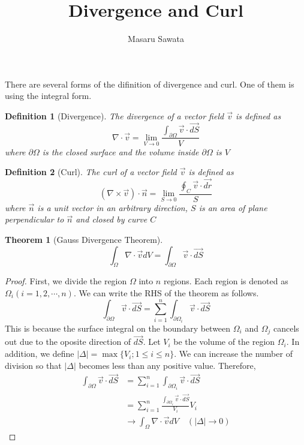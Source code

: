 \documentclass[letterpaper, 12pt]{article}
\title{Divergence and Curl}
\author{Masaru Sawata}
\theoremstyle{custom}
\newtheorem{definition}{Definition}
\newtheorem*{theorem}{Theorem}
\begin{document}
\maketitle
There are several forms of the difinition of divergence and curl. One of them is using the integral form.
\begin{definition}[Divergence]
  The divergence of a vector field $\vec{v}$ is defined as
  \begin{equation*}
    \nabla \cdot \vec{v} = \lim_{V \rightarrow 0} \frac{\displaystyle \int_{\partial \Omega} \vec{v} \cdot \vec{dS}}{V}
  \end{equation*}
  where $\partial \Omega$ is the closed surface and the volume inside $\partial \Omega$ is $V$
\end{definition}

\bigskip

\begin{definition}[Curl]
  The curl of a vector field $\vec{v}$ is defined as
  \begin{equation*}
    \left( \nabla \times \vec{v} \right) \cdot \vec{n} = \lim_{S \rightarrow 0} \frac{\displaystyle \oint_{C} \vec{v} \cdot \vec{dr}}{S}
  \end{equation*}
  where $\vec{n}$ is a unit vector in an arbitrary direction, $S$ is an area of plane perpendicular to $\vec{n}$ and closed by curve $C$
\end{definition}

\bigskip

\begin{theorem}[Gauss Divergence Theorem]
  \begin{equation*}
    \int_{\Omega} \nabla \cdot \vec{v} dV = \int_{\partial \Omega} \vec{v} \cdot \vec{dS}
  \end{equation*}
\end{theorem}
\begin{proof}
  First, we divide the region $\Omega$ into $n$ regions. Each region is denoted as $\Omega_i (i=1,2,\cdots , n)$.
  We can write the RHS of the theorem as follows.
  \begin{equation*}
    \int_{\partial \Omega} \vec{v} \cdot \vec{dS} = \sum_{i=1}^{n}\int_{\partial \Omega_i} \vec{v} \cdot \vec{dS}
  \end{equation*}
  This is because the surface integral on the boundary between $\Omega_i$ and $\Omega_j$ cancels out due to the oposite direction of $\vec{dS}$.
  Let $V_i$ be the volume of the region $\Omega_i$. In addition, we define $| \Delta |=\max \{ V_i;1 \leq i \leq n \}$.
  We can increase the number of division so that $| \Delta |$ becomes less than any positive value. Therefore,
  \begin{align*}
    \int_{\partial \Omega} \vec{v} \cdot \vec{dS} 
    &= \sum_{i=1}^{n}\int_{\partial \Omega_i} \vec{v} \cdot \vec{dS}\\
    &= \sum_{i=1}^{n}\frac{\displaystyle \int_{\partial \Omega_i} \vec{v} \cdot \vec{dS}}{V_i} V_i\\
    &\rightarrow \int_{\Omega} \nabla \cdot \vec{v} dV \quad (|\Delta| \rightarrow 0)
  \end{align*}
\end{proof}
\end{document}
